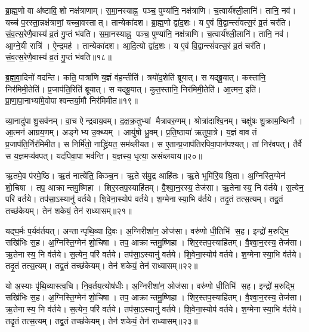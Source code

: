 ब्रा॒ह्म॒णो वा अ॑ष्टावि॒शो नक्ष॑त्राणाम्।
स॒मा॒नस्याह्न॒ पञ्च॒ पुण्या॑नि॒ नक्ष॑त्राणि।
च॒त्वार्य॑श्ली॒लानि॑।
तानि॒ नव॑।
यच्च॑ प॒रस्ता॒न्नक्ष॑त्राणां॒ यच्चा॒वस्तात्।
तान्येका॑दश।
ब्रा॒ह्म॒णो द्वा॑द॒शः।
य ए॒वं वि॒द्वान्त्सं॑वत्स॒रं व्र॒तं चर॑ति।
सं॒व॒त्स॒रेणै॒वास्य॑ व्र॒तं गु॒प्तं भ॑वति।
स॒मा॒नस्याह्न॒ पञ्च॒ पुण्या॑नि॒ नक्ष॑त्राणि।
च॒त्वार्य॑श्ली॒लानि॑।
तानि॒ नव॑।
आ॒ग्ने॒यी रात्रि॑।
ऐ॒न्द्रमह॑।
तान्येका॑दश।
आ॒दि॒त्यो द्वा॑द॒शः।
य ए॒वं वि॒द्वान्त्सं॑वत्स॒रं व्र॒तं चर॑ति।
सं॒व॒त्स॒रेणै॒वास्य॑ व्र॒तं गु॒प्तं भ॑वति॥१८॥\anuvakamend[स॒ङ्ग॒वाथ्षो॑ड॒शिनं॒ निर॑मिमत॒ तत्तदात्त॑वीर्यं निर्मा॒र्गो व॑देद्भवति समा॒नस्याह्न॒ पञ्च॒ पुण्या॑नि॒ नक्ष॑त्राण्य॒ष्टौ च॑]

ब्र॒ह्म॒वा॒दिनो॑ वदन्ति।
कति॒ पात्रा॑णि य॒ज्ञं व॑ह॒न्तीति॑।
त्रयो॑द॒शेति॑ ब्रूयात्।
स यद्ब्रू॒यात्।
कस्तानि॒ निर॑मिमी॒तेति॑।
प्र॒जाप॑ति॒रिति॑ ब्रूयात्।
स यद्ब्रू॒यात्।
कुत॒स्तानि॒ निर॑मिमी॒तेति॑।
आ॒त्मन॒ इति॑।
प्रा॒णा॒पा॒नाभ्या॑मे॒वोपा\-श्वन्तर्या॒मौ निर॑मिमीत॥१९॥

व्या॒नादु॑पाशु॒सव॑नम्।
वा॒च ऐन्द्रवाय॒वम्।
द॒क्ष॒क्र॒तुभ्यां मैत्रावरु॒णम्।
श्रोत्रा॑दाश्वि॒नम्।
चक्षु॑षः शु॒क्राम॒न्थिनौ।
आ॒त्मन॑ आग्रय॒णम्।
अङ्गेभ्य उ॒क्थ्यम्।
आयु॑षो ध्रु॒वम्।
प्र॒ति॒ष्ठाया॑ ऋतुपा॒त्रे।
य॒ज्ञं वाव तं प्र॒जाप॑ति॒र्निर॑मिमीत।
स निर्मि॑तो॒ नाद्ध्रि॑यत॒ सम॑व्लीयत।
स ए॒तान्प्र॒जाप॑तिरपिवा॒पान॑पश्यत्।
तां निर॑वपत्।
तैर्वै स य॒ज्ञमप्य॑वपत्।
यद॑पिवा॒पा भव॑न्ति।
य॒ज्ञस्य॒ धृत्या॒ असंव्लयाय॥२०॥\anuvakamend[उ॒पा॒श्व॒न्त॒र्या॒मौ निर॑मिमीतामिमीत॒ षट्च॑]

ऋ॒तमे॒व प॑रमे॒ष्ठि।
ऋ॒तं नात्ये॑ति॒ किञ्च॒न।
ऋ॒ते स॑मु॒द्र आहि॑तः।
ऋ॒ते भूमि॑रि॒यश्रि॒ता।
अ॒ग्निस्ति॒ग्मेन॑ शो॒चिषा।
तप॒ आक्रान्तमु॒ष्णिहा।
शिर॒स्तप॒स्याहि॑तम्।
वै॒श्वा॒न॒रस्य॒ तेज॑सा।
ऋ॒तेनास्य॒ नि व॑र्तये।
स॒त्येन॒ परि॑ वर्तये।
तप॑सा॒ऽस्यानु॑ वर्तये।
शि॒वेना॒स्योप॑ वर्तये।
श॒ग्मेनास्या॒भि व॑र्तये।
तदृ॒तं तत्स॒त्यम्।
तद्व्र॒तं तच्छ॑केयम्।
तेन॑ शकेयं॒ तेन॑ राध्यासम्॥२१॥

यद्घ॒र्मः प॒र्यव॑र्तयत्।
अन्तान्पृथि॒व्या दि॒वः।
अ॒ग्निरीशा॑न॒ ओज॑सा।
वरु॑णो धी॒तिभि॑ स॒ह।
इन्द्रो॑ म॒रुद्भि॒ सखि॑भिः स॒ह।
अ॒ग्निस्ति॒ग्मेन॑ शो॒चिषा।
तप॒ आक्रान्तमु॒ष्णिहा।
शिर॒स्तप॒स्याहि॑तम्।
वै॒श्वा॒न॒रस्य॒ तेज॑सा।
ऋ॒तेनास्य॒ नि व॑र्तये।
स॒त्येन॒ परि॑ वर्तये।
तप॑सा॒ऽस्यानु॑ वर्तये।
शि॒वेना॒स्योप॑ वर्तये।
श॒ग्मेनास्या॒भि व॑र्तये।
तदृ॒तं तत्स॒त्यम्।
तद्व्र॒तं तच्छ॑केयम्।
तेन॑ शकेयं॒ तेन॑ राध्यासम्॥२२॥

यो अ॒स्याः पृ॑थि॒व्यास्त्व॒चि।
नि॒व॒र्तय॒त्योष॑धीः।
अ॒ग्निरीशा॑न॒ ओज॑सा।
वरु॑णो धी॒तिभि॑ स॒ह।
इन्द्रो॑ म॒रुद्भि॒ सखि॑भिः स॒ह।
अ॒ग्निस्ति॒ग्मेन॑ शो॒चिषा।
तप॒ आक्रान्तमु॒ष्णिहा।
शिर॒स्तप॒स्याहि॑तम्।
वै॒श्वा॒न॒रस्य॒ तेज॑सा।
ऋ॒तेनास्य॒ नि व॑र्तये।
स॒त्येन॒ परि॑ वर्तये।
तप॑सा॒ऽस्यानु॑ वर्तये।
शि॒वेना॒स्योप॑ वर्तये।
श॒ग्मेनास्या॒भि व॑र्तये।
तदृ॒तं तत्स॒त्यम्।
तद्व्र॒तं तच्छ॑केयम्।
तेन॑ शकेयं॒ तेन॑ राध्यासम्॥२३॥

